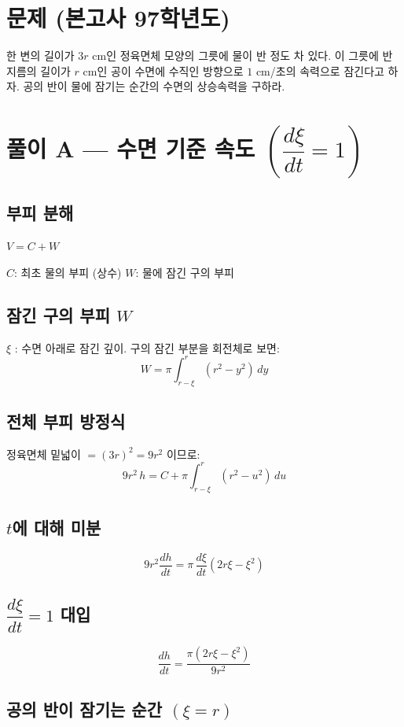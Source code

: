 \section*{문제 (본고사 97학년도)}

한 변의 길이가 $3r$ cm인 정육면체 모양의 그릇에 물이 반 정도 차 있다.
이 그릇에 반지름의 길이가 $r$ cm인 공이 수면에 수직인 방향으로
$1$ cm/초의 속력으로 잠긴다고 하자.
공의 반이 물에 잠기는 순간의 수면의 상승속력을 구하라.

\section*{풀이 A — 수면 기준 속도 $\left(\dfrac{d\xi}{dt}=1\right)$}

\subsection*{부피 분해}

$V = C + W$

\noindent $C$: 최초 물의 부피 (상수) \quad $W$: 물에 잠긴 구의 부피

\subsection*{잠긴 구의 부피 $W$}

$\xi$ : 수면 아래로 잠긴 깊이. 구의 잠긴 부분을 회전체로 보면:
\[
  W = \pi \int_{r-\xi}^{r} (r^2 - y^2)\,dy
\]

\subsection*{전체 부피 방정식}

정육면체 밑넓이 $= (3r)^2 = 9r^2$ 이므로:
\[
  9r^2\, h = C + \pi \int_{r-\xi}^{r} (r^2 - u^2)\,du
\]

\subsection*{$t$에 대해 미분}

\[
  9r^2 \frac{dh}{dt} = \pi\,\frac{d\xi}{dt}(2r\xi - \xi^2)
\]

\subsection*{$\dfrac{d\xi}{dt} = 1$ 대입}

\[
  \frac{dh}{dt} = \frac{\pi(2r\xi - \xi^2)}{9r^2}
\]

\subsection*{공의 반이 잠기는 순간 $(\xi = r)$}

